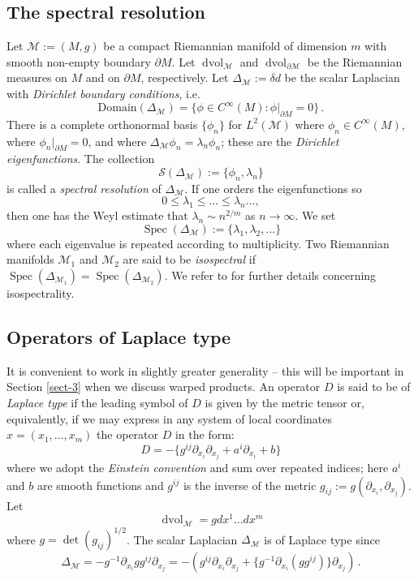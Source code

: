 \documentclass{amsart}
\begin{document}
\subsection{The spectral resolution} Let $\mathcal{M}:=(M,g)$ be a compact Riemannian manifold of dimension
$m$ with smooth non-empty boundary
$\partial M$. Let $\operatorname{dvol}_{\mathcal{M}}$ and $\operatorname{dvol}_{\partial\mathcal{M}}$ be the Riemannian measures on $M$ and
on
$\partial M$, respectively. Let $\Delta_{\mathcal{M}}:=\delta d$ be the scalar Laplacian with {\it
Dirichlet boundary conditions}, i.e.
$$\text{Domain}(\Delta_{\mathcal{M}})=\{\phi\in C^\infty(M):\phi|_{\partial M}=0\}\,.$$
There is a complete orthonormal
basis
$\{\phi_n\}$ for
$L^2(\mathcal{M})$ where $\phi_n\in C^\infty(M)$, where
$\phi_n|_{\partial M}=0$, and where
$\Delta_{\mathcal{M}}\phi_n=\lambda_n\phi_n$; these are the {\it Dirichlet eigenfunctions}. The collection
$$\mathcal{S}(\Delta_{\mathcal{M}}):=\{\phi_n,\lambda_n\}$$
is called a {\it spectral resolution} of $\Delta_{\mathcal{M}}$. If one orders the eigenfunctions so
$$0\le\lambda_1\le...\le\lambda_n\ldots,$$
 then one has the Weyl estimate \cite{We15} that $\lambda_n\sim n^{2/m}$ as
$n\rightarrow\infty$. We set
$$\operatorname{Spec}(\Delta_{\mathcal{M}}):=\{\lambda_1,\lambda_2,...\}$$
where each eigenvalue is repeated according to multiplicity.
Two Riemannian manifolds $\mathcal{M}_1$ and $\mathcal{M}_2$ are said to be {\it isospectral} if
$\operatorname{Spec}(\Delta_{\mathcal{M}_1})=\operatorname{Spec}(\Delta_{\mathcal{M}_2})$. We
refer to \cite{GPS05} for further details concerning isospectrality.

\subsection{Operators of Laplace type}
It is convenient to work in slightly greater generality -- this will be important
in Section \ref{sect-3} when we discuss warped products. An operator
$D$ is said to be of {\it Laplace type} if the leading symbol of
$D$ is given by the metric tensor or, equivalently, if we may express in any system of
local coordinates
$x=(x_1,...,x_m)$ the operator $D$ in the form:
$$D=-\{g^{ij}\partial_{x_i}\partial_{x_j}+a^i\partial_{x_i}+b\}$$
where we adopt the {\it Einstein convention} and sum over repeated indices; here $a^i$ and $b$ are smooth
functions and $g^{ij}$ is the inverse of the metric $g_{ij}:=g(\partial_{x_i},\partial_{x_j})$. Let
$$\operatorname{dvol}_{\mathcal{M}}=gdx^1...dx^m$$
where 
$g=\det(g_{ij})^{1/2}$. The scalar Laplacian
$\Delta_{\mathcal{M}}$ is of Laplace type since
\begin{equation}\label{eqn-1.a}
\Delta_{\mathcal{M}}=-g^{-1}\partial_{x_i}gg^{ij}\partial_{x_j}
=-\left(g^{ij}\partial_{x_i}\partial_{x_j}+\{g^{-1}\partial_{x_i}(gg^{ij})\}\partial_{x_j}\right)\,.
\end{equation}
\end{document}
